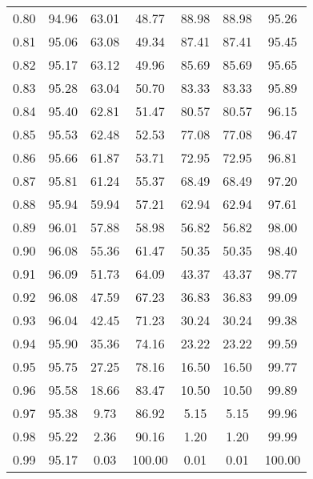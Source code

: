 \begin{tabular}{|c|c|c|c|c|c|c|}
      0.80 &     94.96 &     63.01 &      48.77 &   88.98 &      88.98 &         95.26 \\
      0.81 &     95.06 &     63.08 &      49.34 &   87.41 &      87.41 &         95.45 \\
      0.82 &     95.17 &     63.12 &      49.96 &   85.69 &      85.69 &         95.65 \\
      0.83 &     95.28 &     63.04 &      50.70 &   83.33 &      83.33 &         95.89 \\
      0.84 &     95.40 &     62.81 &      51.47 &   80.57 &      80.57 &         96.15 \\
      0.85 &     95.53 &     62.48 &      52.53 &   77.08 &      77.08 &         96.47 \\
      0.86 &     95.66 &     61.87 &      53.71 &   72.95 &      72.95 &         96.81 \\
      0.87 &     95.81 &     61.24 &      55.37 &   68.49 &      68.49 &         97.20 \\
      0.88 &     95.94 &     59.94 &      57.21 &   62.94 &      62.94 &         97.61 \\
      0.89 &     96.01 &     57.88 &      58.98 &   56.82 &      56.82 &         98.00 \\
      0.90 &     96.08 &     55.36 &      61.47 &   50.35 &      50.35 &         98.40 \\
      0.91 &     96.09 &     51.73 &      64.09 &   43.37 &      43.37 &         98.77 \\
      0.92 &     96.08 &     47.59 &      67.23 &   36.83 &      36.83 &         99.09 \\
      0.93 &     96.04 &     42.45 &      71.23 &   30.24 &      30.24 &         99.38 \\
      0.94 &     95.90 &     35.36 &      74.16 &   23.22 &      23.22 &         99.59 \\
      0.95 &     95.75 &     27.25 &      78.16 &   16.50 &      16.50 &         99.77 \\
      0.96 &     95.58 &     18.66 &      83.47 &   10.50 &      10.50 &         99.89 \\
      0.97 &     95.38 &      9.73 &      86.92 &    5.15 &       5.15 &         99.96 \\
      0.98 &     95.22 &      2.36 &      90.16 &    1.20 &       1.20 &         99.99 \\
      0.99 &     95.17 &      0.03 &     100.00 &    0.01 &       0.01 &        100.00 \\
\bottomrule
\end{tabular}
